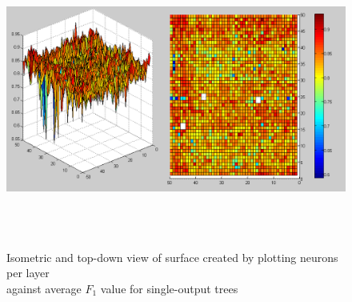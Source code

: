 \documentclass[a4paper]{article}
\begin{document}
\begin{figure}[p]
  \centering
  {\includegraphics[height=90mm]{1-out-topology.png}}
  \caption{Isometric and top-down view of surface created by plotting neurons per layer \\ against average $F_1$ value for single-output trees}
\end{figure}
\end{document}
